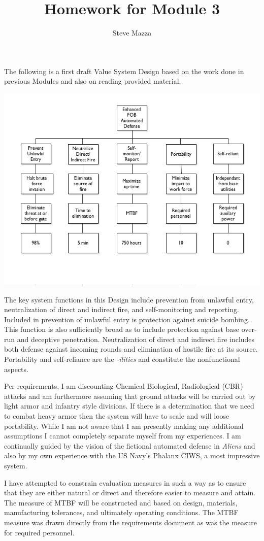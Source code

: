 \documentclass[letterpaper,10pt]{article}
\title{Homework for Module 3}
\author{Steve Mazza}
\begin{document}
\maketitle

The following is a first draft Value System Design based on the work done in previous Modules and also on reading provided material.

\begin{center}
\includegraphics[scale=0.75]{module3mazza.png}
\end{center}

The key system functions in this Design include prevention from unlawful entry, neutralization of direct and indirect fire, and self-monitoring and reporting.  Included in prevention of unlawful entry is protection against suicide bombing.  This function is also sufficiently broad as to include protection against base over-run and deceptive penetration.  Neutralization of direct and indirect fire includes both defense against incoming rounds and elimination of hostile fire at its source.  Portability and self-reliance are the \emph{-ilities} and constitute the nonfunctional aspects.

Per requirements, I am discounting Chemical Biological, Radiological (CBR) attacks and am furthermore assuming that ground attacks will be carried out by light armor and infantry style divisions.  If there is a determination that we need to combat heavy armor then the system will have to scale and will loose portability.  While I am not aware that I am presently making any additional assumptions I cannot completely separate myself from my experiences.  I am continually guided by the vision of the fictional automated defense in \emph{Aliens} and also by my own experience with the US Navy's Phalanx CIWS, a most impressive system.

I have attempted to constrain evaluation measures in such a way as to ensure that they are either natural or direct and therefore easier to measure and attain.  The measure of MTBF will be constructed and based on design, materials, manufacturing tolerances, and ultimately operating conditions.  The MTBF measure was drawn directly from the requirements document as was the measure for required personnel.
\end{document}

